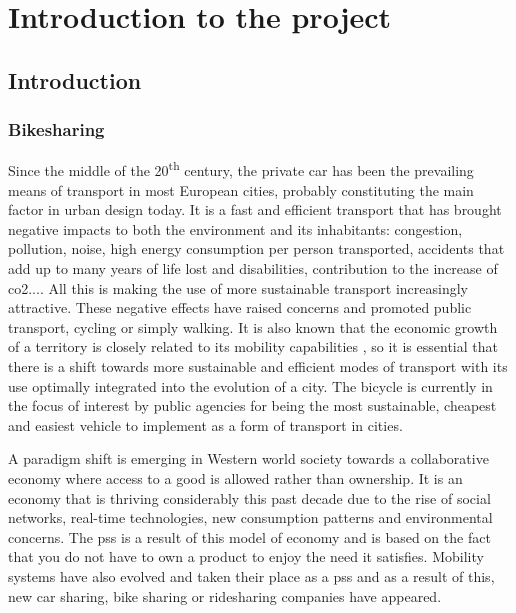 \section{Introduction to the project}
\subsection{Introduction}
\subsubsection{Bikesharing}


Since the middle of the 20\textsuperscript{th} century, the private car has been the prevailing means of transport in most European cities, probably constituting the main factor in urban design today. It is a fast and efficient transport that has brought negative impacts to both the environment and its inhabitants: congestion, pollution, noise, high energy consumption per person transported, accidents that add up to many years of life lost and disabilities, contribution to the increase of \acrshort{co2}.... All this is making the use of more sustainable transport increasingly attractive. These negative effects have raised concerns and promoted public transport, cycling or simply walking. It is also known that the economic growth of a territory is closely related to its mobility capabilities \cite{europe}, so it is essential that there is a shift towards more sustainable and efficient modes of transport with its use optimally integrated into the evolution of a city. The bicycle is currently in the focus of interest by public agencies for being the most sustainable, cheapest and easiest vehicle to implement as a form of transport in cities.
\newline


A paradigm shift is emerging in Western world society towards a collaborative economy where access to a good is allowed rather than ownership. It is an economy that is thriving considerably this past decade due to the rise of social networks, real-time technologies, new consumption patterns and environmental concerns. The \acrfull{pss} is a result of this model of economy and is based on the fact that you do not have to own a product to enjoy the need it satisfies. Mobility systems have also evolved and taken their place as a \acrshort{pss} and as a result of this, new car sharing, bike sharing or ridesharing companies have appeared.
\newline

